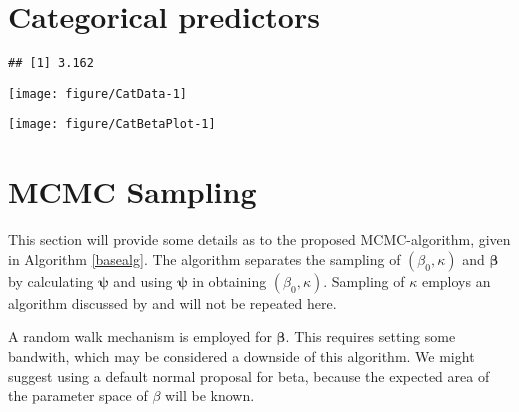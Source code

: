 \documentclass[12pt,a4paper]{article}\usepackage[]{graphicx}\usepackage[]{color}
\makeatletter
\def\maxwidth{ %
  \ifdim\Gin@nat@width>\linewidth
    \linewidth
  \else
    \Gin@nat@width
  \fi
}
\newenvironment{kframe}{%
 \def\at@end@of@kframe{}%
 \ifinner\ifhmode%
  \def\at@end@of@kframe{\end{minipage}}%
  \begin{minipage}{\columnwidth}%
 \fi\fi%
 \def\FrameCommand##1{\hskip\@totalleftmargin \hskip-\fboxsep
 \colorbox{shadecolor}{##1}\hskip-\fboxsep
     \hskip-\linewidth \hskip-\@totalleftmargin \hskip\columnwidth}%
 \MakeFramed {\advance\hsize-\width
   \@totalleftmargin\z@ \linewidth\hsize
   \@setminipage}}%
 {\par\unskip\endMakeFramed%
 \at@end@of@kframe}
\newenvironment{knitrout}{}{} %
\makeatother
\begin{document}
\section{Categorical predictors}

\begin{knitrout}
\color{fgcolor}\begin{kframe}
\begin{verbatim}
## [1] 3.162
\end{verbatim}
\end{kframe}

{\centering \texttt{[image: figure/CatData-1]} 

}



\end{knitrout}

\begin{knitrout}
\color{fgcolor}

{\centering \texttt{[image: figure/CatBetaPlot-1]} 

}



\end{knitrout}


\section{MCMC Sampling}

This section will provide some details as to the proposed MCMC-algorithm, given in Algorithm \ref{basealg}. The algorithm separates the sampling of $(\beta_0, \kappa)$ and $\boldsymbol\beta$ by calculating $\boldsymbol\psi$ and using $\boldsymbol\psi$ in obtaining $(\beta_0, \kappa)$. Sampling of $\kappa$ employs an algorithm discussed by \citet{forbes2014fast} and will not be repeated here.

A random walk mechanism is employed for $\boldsymbol\beta$. This requires setting some bandwith, which may be considered a downside of this algorithm. We might suggest using a default normal proposal for beta, because the expected area of the parameter space of $\beta$ will be known.
\end{document}

